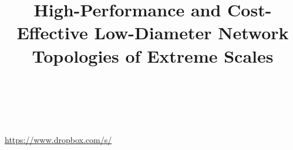 \documentclass[conference]{IEEEtran}
\begin{document}
\title{High-Performance and Cost-Effective Low-Diameter Network Topologies of Extreme Scales}


\author{
\IEEEauthorblockA{
%
%
} \\
}


\maketitle

\thispagestyle{plain}
\pagestyle{plain}




\begin{abstract}
%
%
%
\end{abstract}


\vspace{0.5em}
%
{\small\noindent{}\\\url{https://www.dropbox.com/s/}}











%


%
\end{document}
